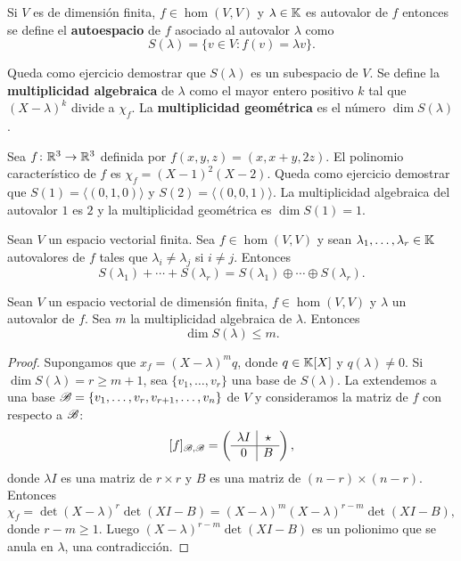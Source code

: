 \begin{block}
	Si $V$ es de dimensión finita, $f\in\hom(V,V)$ y $\lambda\in\mathbb{K}$ es
	autovalor de $f$ entonces se define el \textbf{autoespacio} de $f$ asociado
	al autovalor $\lambda$ como 
    \[
        S(\lambda)=\{v\in V:f(v)=\lambda v\}.
    \]
    
	Queda como ejercicio demostrar que $S(\lambda)$ es un subespacio de $V$.
	Se define la
    \textbf{multiplicidad algebraica} de $\lambda$ como el mayor entero
    positivo $k$ tal que $(X-\lambda)^k$ divide a $\chi_f$.  La
    \textbf{multiplicidad geométrica} es el número $\dim S(\lambda)$. 
\end{block}

\begin{example}
	Sea $f\colon\mathbb{R}^3\to\mathbb{R}^3$ definida por $f(x,y,z)=(x,x+y,2z)$.  El polinomio
	característico de $f$ es $\chi_f=(X-1)^2(X-2)$. Queda como ejercicio
	demostrar que $S(1)=\langle(0,1,0)\rangle$ y $S(2)=\langle(0,0,1)\rangle$.
	La multiplicidad algebraica del autovalor $1$ es $2$ y la
	multiplicidad geométrica es $\dim S(1)=1$. 
\end{example}

\begin{lem}
	Sean $V$ un espacio vectorial finita. Sea $f\in\hom(V,V)$ y sean
	$\lambda_1,\dots,\lambda_r\in\mathbb{K}$ autovalores de $f$ tales que
	$\lambda_i\ne\lambda_j$ si $i\ne j$. Entonces
	\[
		S(\lambda_1)+\cdots+S(\lambda_r)=S(\lambda_1)\oplus\cdots\oplus S(\lambda_r).
	\]
\end{lem}
\begin{lem}
	Sean $V$ un espacio vectorial de dimensión finita, $f\in\hom(V,V)$ y
	$\lambda$ un autovalor de $f$. Sea $m$ la multiplicidad algebraica de
	$\lambda$. Entonces 
	\[
		\dim S(\lambda)\leq m.
	\]
	\begin{proof}
		Supongamos que $x_f=(X-\lambda)^mq$, donde $q\in\mathbb{K}[X]$ y
		$q(\lambda)\ne0$. Si $\dim S(\lambda)=r\geq m+1$, sea
		$\{v_1,\dots,v_r\}$ una base de $S(\lambda)$. La extendemos a una base
		$\mathscr{B}=\{v_1,\dots,v_r,v_{r+1},\dots,v_n\}$ de $V$ y consideramos la
		matriz de $f$ con respecto a $\mathscr{B}$:
		\[
		[f]_{\mathscr{B},\mathscr{B}}=
		\left(
			\begin{array}{c|c}
			\lambda I & \star\\
			\hline
			0 & B
		\end{array}
		\right),
		\]
		donde $\lambda I$ es una matriz de $r\times r$ y $B$ es una matriz de
		$(n-r)\times(n-r)$. Entonces
		\[
		\chi_f=\det(X-\lambda)^r\det(XI-B)=(X-\lambda)^m(X-\lambda)^{r-m}\det(XI-B),
		\]
		donde $r-m\geq1$. Luego $(X-\lambda)^{r-m}\det(XI-B)$ es un polionimo
		que se anula en $\lambda$, una contradicción.
	\end{proof}
\end{lem}

